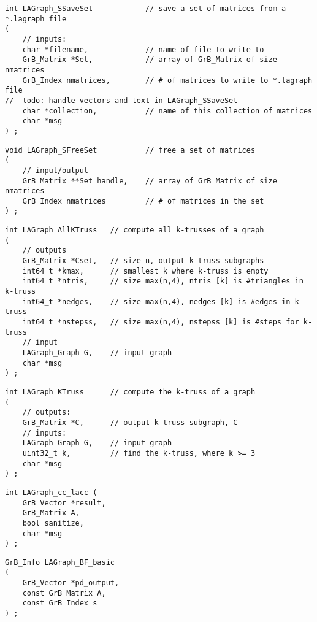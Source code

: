 \begin{verbatim}
int LAGraph_SSaveSet            // save a set of matrices from a *.lagraph file
(
    // inputs:
    char *filename,             // name of file to write to
    GrB_Matrix *Set,            // array of GrB_Matrix of size nmatrices
    GrB_Index nmatrices,        // # of matrices to write to *.lagraph file
//  todo: handle vectors and text in LAGraph_SSaveSet
    char *collection,           // name of this collection of matrices
    char *msg
) ;
\end{verbatim}




\begin{verbatim}
void LAGraph_SFreeSet           // free a set of matrices
(
    // input/output
    GrB_Matrix **Set_handle,    // array of GrB_Matrix of size nmatrices
    GrB_Index nmatrices         // # of matrices in the set
) ;
\end{verbatim}




\begin{verbatim}
int LAGraph_AllKTruss   // compute all k-trusses of a graph
(
    // outputs
    GrB_Matrix *Cset,   // size n, output k-truss subgraphs
    int64_t *kmax,      // smallest k where k-truss is empty
    int64_t *ntris,     // size max(n,4), ntris [k] is #triangles in k-truss
    int64_t *nedges,    // size max(n,4), nedges [k] is #edges in k-truss
    int64_t *nstepss,   // size max(n,4), nstepss [k] is #steps for k-truss
    // input
    LAGraph_Graph G,    // input graph
    char *msg
) ;
\end{verbatim}




\begin{verbatim}
int LAGraph_KTruss      // compute the k-truss of a graph
(
    // outputs:
    GrB_Matrix *C,      // output k-truss subgraph, C
    // inputs:
    LAGraph_Graph G,    // input graph
    uint32_t k,         // find the k-truss, where k >= 3
    char *msg
) ;
\end{verbatim}




\begin{verbatim}
int LAGraph_cc_lacc (
    GrB_Vector *result,
    GrB_Matrix A,
    bool sanitize,
    char *msg
) ;
\end{verbatim}




\begin{verbatim}
GrB_Info LAGraph_BF_basic
(
    GrB_Vector *pd_output,
    const GrB_Matrix A,
    const GrB_Index s
) ;
\end{verbatim}




